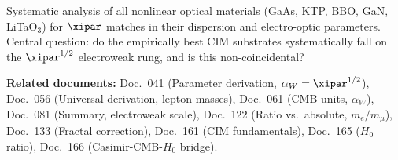 \bigskip

\begin{important}
Systematic analysis of all nonlinear optical materials (GaAs, KTP, BBO,
GaN, LiTaO$_3$) for $\xipar$ matches in their dispersion and electro-optic
parameters. Central question: do the empirically best CIM substrates
systematically fall on the $\xipar^{1/2}$ electroweak rung, and is this
non-coincidental?
\end{important}

\bigskip\bigskip

\noindent\textbf{Related documents:}
Doc.~041 (Parameter derivation, $\alpha_W = \xipar^{1/2}$),
Doc.~056 (Universal derivation, lepton masses),
Doc.~061 (CMB units, $\alpha_W$),
Doc.~081 (Summary, electroweak scale),
Doc.~122 (Ratio vs.\ absolute, $m_e/m_\mu$),
Doc.~133 (Fractal correction),
Doc.~161 (CIM fundamentals),
Doc.~165 ($H_0$ ratio),
Doc.~166 (Casimir-CMB-$H_0$ bridge).
